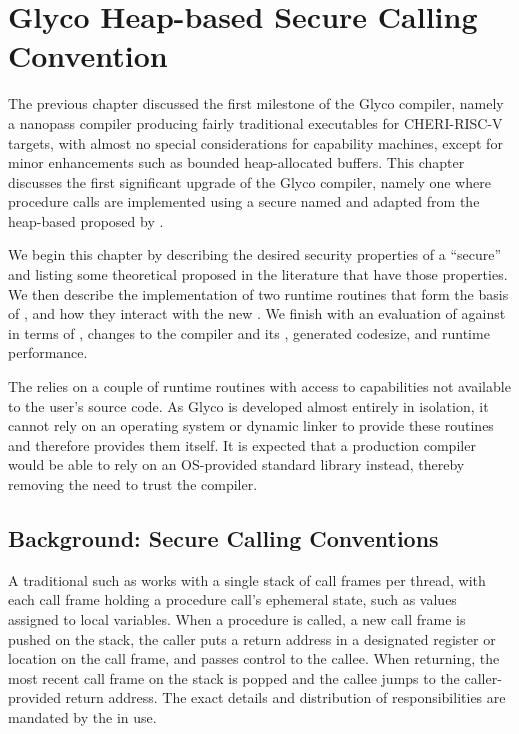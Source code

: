\documentclass[main.tex]{subfiles}
\begin{document}
\onlyinsubfile{\mainmatter{}}

\chapter{Glyco Heap-based Secure Calling Convention}
The previous chapter discussed the first milestone of the Glyco compiler, namely a nanopass compiler producing fairly traditional executables for CHERI-RISC-V targets, with almost no special considerations for capability machines, except for minor enhancements such as bounded heap-allocated buffers. This chapter discusses the first significant upgrade of the Glyco compiler, namely one where procedure calls are implemented using a secure \cc{} named \textbf{\ghscc{}} and adapted from the heap-based \cc{} proposed by \cite{cerise}.

We begin this chapter by describing the desired security properties of a \enquote{secure} \cc{} and listing some theoretical \ccs{} proposed in the literature that have those properties. We then describe the implementation of two runtime routines that form the basis of \ghscc{}, and how they interact with the new \cc{}. We finish with an evaluation of \ghscc{} against \gccc{} in terms of \lse{}, changes to the compiler and its \ils{}, generated codesize, and runtime performance.

The \cc{} relies on a couple of runtime routines with access to capabilities not available to the user's source code. As Glyco is developed almost entirely in isolation, it cannot rely on an operating system or dynamic linker to provide these routines and therefore provides them itself. It is expected that a production compiler would be able to rely on an OS-provided standard library instead, thereby removing the need to trust the compiler.

\section{Background: Secure Calling Conventions}
A traditional \cc{} such as \gccc{} works with a single stack of call frames per thread, with each call frame holding a procedure call's ephemeral state, such as values assigned to local variables. When a procedure is called, a new call frame is pushed on the stack, the caller puts a return address in a designated register or location on the call frame, and passes control to the callee. When returning, the most recent call frame on the stack is popped and the callee jumps to the caller-provided return address. The exact details and distribution of responsibilities are mandated by the \cc{} in use.
\end{document}
